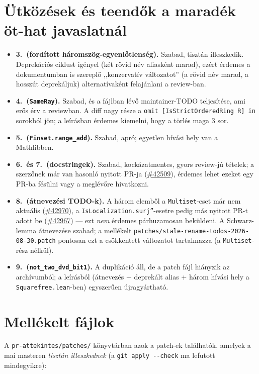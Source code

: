 \documentclass[11pt,a4paper]{article}
\newcommand{\lean}[1]{\texttt{\small #1}}
\newcommand{\bk}{\allowbreak}
\newcommand{\pr}[1]{\href{https://github.com/leanprover-community/mathlib4/pull/#1}{\##1}}
\begin{document}
\section{Ütközések és teendők a maradék öt-hat javaslatnál}

\begin{itemize}[nosep]
  \item \textbf{3.\ (fordított háromszög-egyenlőtlenség).} Szabad, tisztán
    illeszkedik. Deprekációs ciklust igényel (két rövid név aliasként marad),
    ezért érdemes a dokumentumban is szereplő ,,konzervatív változatot''
    (a rövid név marad, a hosszút deprekáljuk) alternatívaként felajánlani a
    review-ban.
  \item \textbf{4.\ (\lean{SameRay}).} Szabad, és a fájlban lévő maintainer-TODO
    teljesítése, ami erős érv a reviewban. A diff nagy része a
    \lean{omit [IsStrictOrderedRing R] in} sorokból jön; a leírásban érdemes
    kiemelni, hogy a törlés maga 3 sor.
  \item \textbf{5.\ (\lean{Finset.\bk range\_\bk add}).} Szabad, apró; egyetlen
    hívási hely van a Mathlibben.
  \item \textbf{6.\ és 7.\ (docstringek).} Szabad, kockázatmentes, gyors
    review-jú tételek; a szerzőnek már van hasonló nyitott PR-ja (\pr{42509}),
    érdemes lehet ezeket egy PR-ba fésülni vagy a meglévőre hivatkozni.
  \item \textbf{8.\ (átnevezési TODO-k).} A három elemből a \lean{Multiset}-eset
    már nem aktuális (\pr{42970}), a \lean{IsLocalization.\bk surj''}-esetre pedig
    más nyitott PR-t adott be (\pr{42967}) --- ezt \emph{nem} érdemes párhuzamosan
    beküldeni. A Schwarz-lemma átnevezése szabad; a mellékelt
    \lean{patches/\bk stale-rename-todos-2026-08-30.\bk patch} pontosan ezt a
    csökkentett változatot tartalmazza (a \lean{Multiset}-rész nélkül).
  \item \textbf{9.\ (\lean{not\_\bk two\_\bk dvd\_\bk bit1}).} A duplikáció áll, de a patch
    fájl hiányzik az archívumból; a leírásból (átnevezés + deprekált alias +
    három hívási hely a \lean{Squarefree.\bk lean}-ben) egyszerűen újragyártható.
\end{itemize}

\section{Mellékelt fájlok}

A \lean{pr-attekintes/\bk patches/\bk } könyvtárban azok a patch-ek találhatók,
amelyek a mai masteren \emph{tisztán illeszkednek} (a \lean{git apply -{}-check}
ma lefutott mindegyikre):
\end{document}
